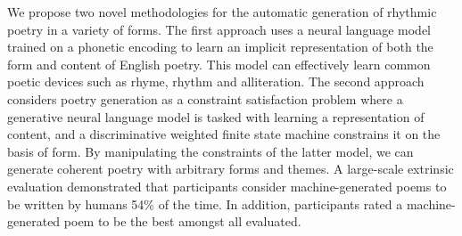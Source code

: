 We propose two novel methodologies for the automatic generation of rhythmic poetry in a variety of forms. The first approach uses a neural language model trained on a phonetic encoding to learn an implicit representation of both the form and content of English poetry. This model can effectively learn common poetic devices such as rhyme, rhythm and alliteration. The second approach considers poetry generation as a constraint satisfaction problem where a generative neural language model is tasked with learning a representation of content, and a discriminative weighted finite state machine constrains it on the basis of form. By manipulating the constraints of the latter model, we can generate coherent poetry with arbitrary forms and themes. A large-scale extrinsic evaluation demonstrated that participants consider machine-generated poems to be written by humans 54\% of the time. In addition, participants rated a machine-generated poem to be the best amongst all evaluated.
